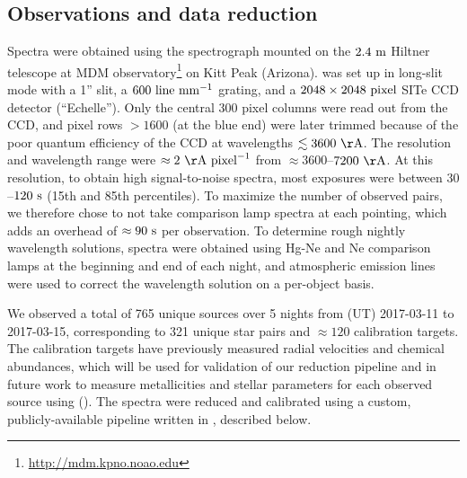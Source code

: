 \documentclass[modern, letterpaper]{aastex61}
\begin{document}
\subsection{Observations and data reduction}\label{sec:reduction}

Spectra were obtained using the  spectrograph mounted on the
$2.4~{\rm m}$ Hiltner telescope at MDM
observatory\footnote{\url{http://mdm.kpno.noao.edu}} on Kitt Peak (Arizona).
 was set up in long-slit mode with a 1'' slit, a $600~{\rm
line}~{\rm mm}^{-1}$ grating, and a $2048\times2048~{\rm pixel}$ SITe CCD
detector (``Echelle'').
Only the central 300 pixel columns were read out from the CCD, and pixel rows
$>1600$ (at the blue end) were later trimmed because of the poor quantum
efficiency of the CCD at wavelengths $\lesssim 3600~{\rm \AA}$.
The resolution and wavelength range were $\approx2~{\rm \AA}~{\rm pixel}^{-1}$
from $\approx 3600$--$7200~{\rm \AA}$.
At this resolution, to obtain high signal-to-noise spectra, most exposures were
between $30$--$120~{\rm s}$ (15th and 85th percentiles).
To maximize the number of observed pairs, we therefore chose to not take
comparison lamp spectra at each pointing, which adds an overhead of $\approx
90~{\rm s}$ per observation.
To determine rough nightly wavelength solutions, spectra were obtained using
Hg-Ne and Ne comparison lamps at the beginning and end of each night, and
atmospheric emission lines were used to correct the wavelength solution on a
per-object basis.

We observed a total of 765 unique sources over 5 nights from (UT) 2017-03-11 to
2017-03-15, corresponding to 321 unique star pairs and $\approx 120$
calibration targets.
The calibration targets have previously measured radial velocities and chemical
abundances, which will be used for validation of our reduction pipeline and in
future work to measure metallicities and stellar parameters for each observed
source using  (\citealt{Ness:TODO}).
The spectra were reduced and calibrated using a custom, publicly-available
pipeline written in \python, described below.
\end{document}

